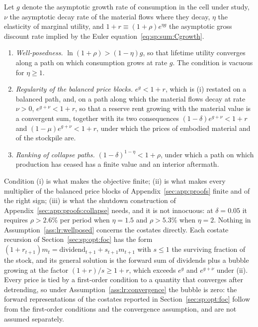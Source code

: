 \begin{assumption}\label{ass:lr:wellposed}
Let $g$ denote the asymptotic growth rate of consumption in the cell under study, $\nu$ the asymptotic decay rate of the material flows where they decay, $\eta$ the elasticity of marginal utility, and $1+r\equiv\left(1+\rho\right)e^{\eta g}$ the asymptotic gross discount rate implied by the Euler equation~\eqref{eq:sp:sum:Cgrowth}.
\begin{enumerate}
\item[(i)] \emph{Well-posedness.} $\ln\left(1+\rho\right)>\left(1-\eta\right)g$, so that lifetime utility converges along a path on which consumption grows at rate $g$. The condition is vacuous for $\eta\ge1$.
\item[(ii)] \emph{Regularity of the balanced price blocks.} $e^{g}<1+r$, which is (i) restated on a balanced path, and, on a path along which the material flows decay at rate $\nu>0$, $e^{g+\nu}<1+r$, so that a reserve rent growing with the material value is a convergent sum, together with its two consequences $\left(1-\delta\right)e^{g+\nu}<1+r$ and $\left(1-\mu\right)e^{g+\nu}<1+r$, under which the prices of embodied material and of the stockpile are.
\item[(iii)] \emph{Ranking of collapse paths.} $\left(1-\delta\right)^{1-\eta}<1+\rho$, under which a path on which production has ceased has a finite value and an interior aftermath.
\end{enumerate}
\end{assumption}

Condition (i) is what makes the objective finite; (ii) is what makes every multiplier of the balanced price blocks of Appendix~\ref{sec:app:proofs} finite and of the right sign; (iii) is what the shutdown construction of Appendix~\ref{sec:app:proofs:collapse} needs, and it is not innocuous: at $\delta=0.05$ it requires $\rho>2.6\%$ per period when $\eta=1.5$ and $\rho>5.3\%$ when $\eta=2$. Nothing in Assumption~\ref{ass:lr:wellposed} concerns the costates directly. Each costate recursion of Section~\ref{sec:sp:opt:foc} has the form $\left(1+r_{t+1}\right)m_t=\text{dividend}_{t+1}+s_{t+1}m_{t+1}$ with $s\le1$ the surviving fraction of the stock, and its general solution is the forward sum of dividends plus a bubble growing at the factor $\left(1+r\right)/s\ge1+r$, which exceeds $e^{g}$ and $e^{g+\nu}$ under (ii). Every price is tied by a first-order condition to a quantity that converges after detrending, so under Assumption~\ref{ass:lr:convergence} the bubble is zero: the forward representations of the costates reported in Section~\ref{sec:sp:opt:foc} follow from the first-order conditions and the convergence assumption, and are not assumed separately.

